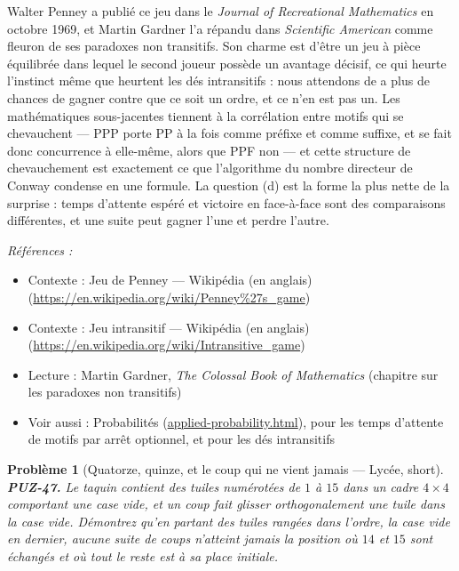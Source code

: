 \documentclass[11pt]{article}
\newtheorem{problem}{Problème}
\newenvironment{refs}{\par\small\noindent\emph{Références :}\begin{itemize}\setlength\itemsep{0pt}}{\end{itemize}\normalsize}
\begin{document}
\noindent Walter Penney a publié ce jeu dans le \textit{Journal of Recreational
Mathematics} en octobre 1969, et Martin Gardner l'a répandu dans \textit{Scientific
American} comme fleuron de ses paradoxes non transitifs. Son charme est d'être un jeu à
pièce équilibrée dans lequel le second joueur possède un avantage décisif, ce qui heurte
l'instinct même que heurtent les dés intransitifs : nous attendons de \og{} a plus de chances de
gagner contre \fg{} que ce soit un ordre, et ce n'en est pas un. Les mathématiques
sous-jacentes tiennent à la corrélation entre motifs qui se chevauchent --- PPP porte PP à la
fois comme préfixe et comme suffixe, et se fait donc concurrence à elle-même, alors que PPF
non --- et cette structure de chevauchement est exactement ce que l'algorithme du nombre
directeur de Conway condense en une formule. La question (d) est la forme la plus nette de
la surprise : temps d'attente espéré et victoire en face-à-face sont des comparaisons
différentes, et une suite peut gagner l'une et perdre l'autre.

\begin{refs}
\item Contexte : Jeu de Penney --- Wikipédia (en anglais) (\url{https://en.wikipedia.org/wiki/Penney%27s_game})
\item Contexte : Jeu intransitif --- Wikipédia (en anglais) (\url{https://en.wikipedia.org/wiki/Intransitive_game})
\item Lecture : Martin Gardner, \textit{The Colossal Book of Mathematics} (chapitre sur les paradoxes non transitifs)
\item Voir aussi : Probabilités (\url{applied-probability.html}), pour les temps d'attente de motifs par arrêt optionnel, et pour les dés intransitifs
\end{refs}

\bigskip

\begin{problem}[{Quatorze, quinze, et le coup qui ne vient jamais --- Lycée, short}]
\textbf{PUZ-47.} Le taquin contient des tuiles numérotées de $ 1 $ à
$ 15 $ dans un cadre $ 4 \times 4 $ comportant une case vide, et un coup fait glisser
orthogonalement une tuile dans la case vide. Démontrez qu'en partant des tuiles rangées dans
l'ordre, la case vide en dernier, aucune suite de coups n'atteint jamais la position où
$ 14 $ et $ 15 $ sont échangés et où tout le reste est à sa place initiale.
\end{problem}
\end{document}
